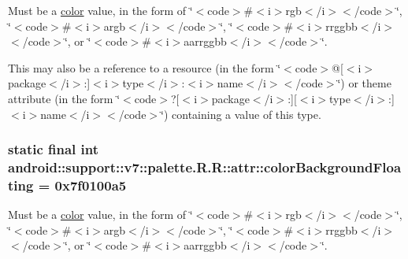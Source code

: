 Must be a \hyperlink{classandroid_1_1support_1_1v7_1_1palette_1_1_r_1_1color}{color} value, in the form of \char`\"{}$<$code$>$\#$<$i$>$rgb$<$/i$>$$<$/code$>$\char`\"{}, \char`\"{}$<$code$>$\#$<$i$>$argb$<$/i$>$$<$/code$>$\char`\"{}, \char`\"{}$<$code$>$\#$<$i$>$rrggbb$<$/i$>$$<$/code$>$\char`\"{}, or \char`\"{}$<$code$>$\#$<$i$>$aarrggbb$<$/i$>$$<$/code$>$\char`\"{}. 

This may also be a reference to a resource (in the form \char`\"{}$<$code$>$@\mbox{[}$<$i$>$package$<$/i$>$:\mbox{]}$<$i$>$type$<$/i$>$:$<$i$>$name$<$/i$>$$<$/code$>$\char`\"{}) or theme attribute (in the form \char`\"{}$<$code$>$?\mbox{[}$<$i$>$package$<$/i$>$:\mbox{]}\mbox{[}$<$i$>$type$<$/i$>$:\mbox{]}$<$i$>$name$<$/i$>$$<$/code$>$\char`\"{}) containing a value of this type. \hypertarget{classandroid_1_1support_1_1v7_1_1palette_1_1_r_1_1attr_37487e1f8fb0990c9c69081e88d5882c}{
\subsubsection[{colorBackgroundFloating}]{\setlength{\rightskip}{0pt plus 5cm}static final int android::support::v7::palette.R.R::attr::colorBackgroundFloating = 0x7f0100a5}}
\label{classandroid_1_1support_1_1v7_1_1palette_1_1_r_1_1attr_37487e1f8fb0990c9c69081e88d5882c}


Must be a \hyperlink{classandroid_1_1support_1_1v7_1_1palette_1_1_r_1_1color}{color} value, in the form of \char`\"{}$<$code$>$\#$<$i$>$rgb$<$/i$>$$<$/code$>$\char`\"{}, \char`\"{}$<$code$>$\#$<$i$>$argb$<$/i$>$$<$/code$>$\char`\"{}, \char`\"{}$<$code$>$\#$<$i$>$rrggbb$<$/i$>$$<$/code$>$\char`\"{}, or \char`\"{}$<$code$>$\#$<$i$>$aarrggbb$<$/i$>$$<$/code$>$\char`\"{}. 

